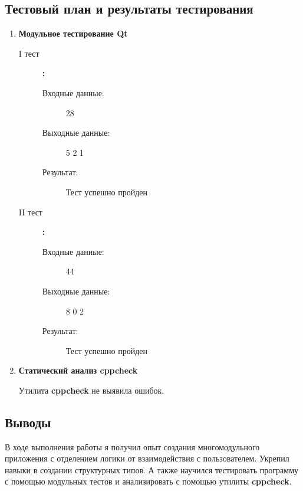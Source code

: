 \documentclass[12pt,a4paper]{report}
\begin{document}
\subsection{Тестовый план и результаты тестирования}
\begin{enumerate}
\item \textbf{Модульное тестирование Qt}
\begin{description}
\item[I тест]\textbf{:}

\begin{flushleft}
\begin{description}
\item[Входные данные:] 28
\item[Выходные данные:] 5 2 1
\item[Результат:] Тест успешно пройден
\end{description}
\end{flushleft}

\end{description}

\begin{description}
\item[II тест]\textbf{:}

\begin{flushleft}
\begin{description}
\item[Входные данные:] 44
\item[Выходные данные:] 8 0 2
\item[Результат:] Тест успешно пройден
\end{description}
\end{flushleft}

\end{description}

\item \textbf{Статический анализ cppcheck}

Утилита \textbf{cppcheck} не выявила ошибок.
\end{enumerate}
\subsection{Выводы}
В ходе выполнения работы я получил опыт создания многомодульного приложения с отделением логики от взаимодействия с пользователем. Укрепил навыки в создании структурных типов. А также научился тестировать программу с помощью модульных тестов и анализировать с помощью утилиты \textbf{cppcheck}.
\end{document}
